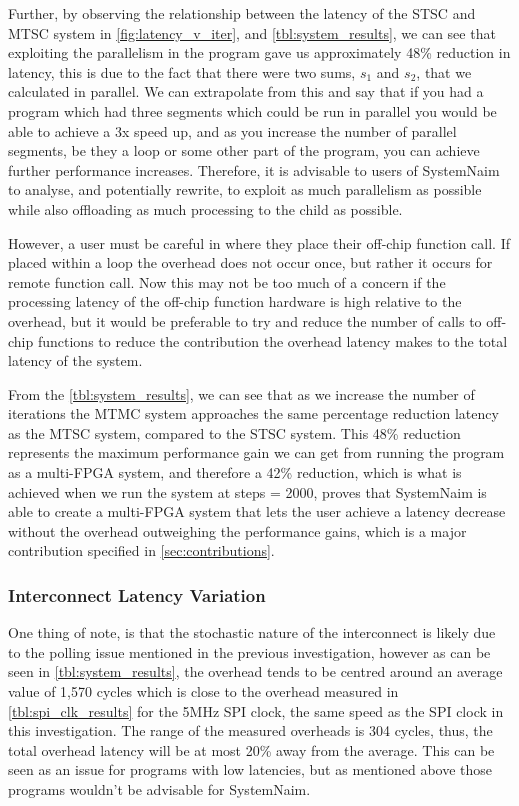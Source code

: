 Further, by observing the relationship between the latency of the STSC and MTSC system in \autoref{fig:latency_v_iter}, and \autoref{tbl:system_results}, we can see that exploiting the parallelism in the program gave us approximately 48\% reduction in latency, this is due to the fact that there were two sums, $s_1$ and $s_2$, that we calculated in parallel. We can extrapolate from this and say that if you had a program which had three segments which could be run in parallel you would be able to achieve a 3x speed up, and as you increase the number of parallel segments, be they a loop or some other part of the program, you can achieve further performance increases. Therefore, it is advisable to users of SystemNaim to analyse, and potentially rewrite, to exploit as much parallelism as possible while also offloading as much processing to the child as possible.

However, a user must be careful in where they place their off-chip function call. If placed within a loop the overhead does not occur once, but rather it occurs for remote function call. Now this may not be too much of a concern if the processing latency of the off-chip function hardware is high relative to the overhead, but it would be preferable to try and reduce the number of calls to off-chip functions to reduce the contribution the overhead latency makes to the total latency of the system.

From the \autoref{tbl:system_results}, we can see that as we increase the number of iterations the MTMC system approaches the same percentage reduction latency as the MTSC system, compared to the STSC system. This 48\% reduction represents the maximum performance gain we can get from running the program as a multi-FPGA system, and therefore a 42\% reduction, which is what is achieved when we run the system at steps = 2000, proves that SystemNaim is able to create a multi-FPGA system that lets the user achieve a latency decrease without the overhead outweighing the performance gains, which is a major contribution specified in \autoref{sec:contributions}. 

\subsubsection{Interconnect Latency Variation}

One thing of note, is that the stochastic nature of the interconnect is likely due to the polling issue mentioned in the previous investigation, however as can be seen in \autoref{tbl:system_results}, the overhead tends to be centred around an average value of 1,570 cycles which is close to the overhead measured in \autoref{tbl:spi_clk_results} for the 5MHz SPI clock, the same speed as the SPI clock in this investigation. The range of the measured overheads is 304 cycles, thus, the total overhead latency will be at most 20\% away from the average. This can be seen as an issue for programs with low latencies, but as mentioned above those programs wouldn't be advisable for SystemNaim. 

